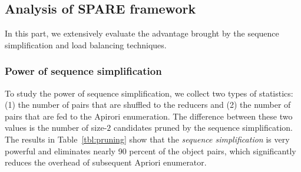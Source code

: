 


\subsection{Analysis of SPARE framework}
In this part, we extensively evaluate the advantage brought by the
sequence simplification and load balancing techniques.

\subsubsection{Power of sequence simplification}
To study the power of sequence simplification,
we collect two types of statistics: (1) the number of pairs that
are shuffled to the reducers and (2) the number of pairs that
are fed to the Apirori enumeration. The difference between these two values is the number of size-$2$ candidates pruned by the sequence simplification.
The results in Table~\ref{tbl:pruning} show that the \emph{sequence simplification} is very powerful and eliminates nearly 90 percent of the object pairs, which significantly reduces the overhead of subsequent Apriori enumerator.

